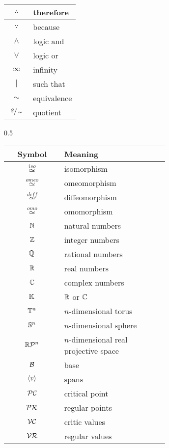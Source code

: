 \begin{table}[H]
{\begin{tabular}{|c|p{0.65\linewidth}|}
					\hline
					$ \therefore $ & therefore \\
					\hline
					$ \because $ & because \\
					\hline
					$ \land $ & logic and \\
					\hline
					$ \lor $ & logic or \\
					\hline
					$ \infty $ & infinity \\
					\hline
					$ \mid $ & such that \\
					\hline
					$ \sim $ & equivalence \\
					\hline
					$ \sfrac{S}{\sim} $ & quotient \\
					\hline
				\end{tabular}
				}
		{0.5}{%
				\begin{tabular}{|c|p{0.65\linewidth}|}
					\hline
					\textbf{Symbol} & \textbf{Meaning} \\
					\hline
					\hline
					$ \stackrel{iso}{\simeq} $ & isomorphism \\
					\hline
					$ \stackrel{omeo}{\simeq} $ & omeomorphism \\
					\hline
					$ \stackrel{diff}{\simeq} $ & diffeomorphism \\
					\hline
					$ \stackrel{omo}{\simeq} $ & omomorphism \\
					\hline
					$ \N $ & natural numbers \\
					\hline
					$ \Z $ & integer numbers \\
					\hline
					$ \Q $ & rational numbers \\
					\hline
					$ \R $ & real numbers \\
					\hline
					$ \C $ & complex numbers \\
					\hline
					$ \K $ & $ \R $ or $ \C $ \\
					\hline
					$ \T^{n} $ & $ n $-dimensional torus \\
					\hline
					$ \S^{n} $ & $ n $-dimensional sphere \\
					\hline
					$ \rp{n} $ & $ n $-dimensional real projective space \\
					\hline
					$ \B $ & base \\
					\hline
					$ \ev{v} $ & spans \\
					\hline
					$ \PC $ &  critical point \\
					\hline
					$ \PR $ &  regular points \\
					\hline
					$ \VC $ & critic values \\
					\hline
					$ \VR $ & regular values \\

\end{tabular}}
\end{table}
